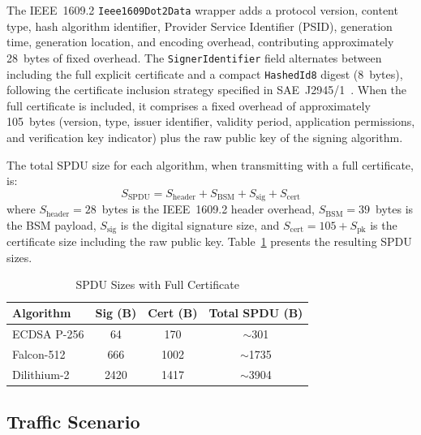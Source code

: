 \documentclass[letterpaper,journal]{IEEEtran}
\begin{document}
The IEEE~1609.2 \texttt{Ieee1609Dot2Data} wrapper adds a protocol version, content type, hash algorithm identifier, Provider Service Identifier (PSID), generation time, generation location, and encoding overhead, contributing approximately 28~bytes of fixed overhead. The \texttt{SignerIdentifier} field alternates between including the full explicit certificate and a compact \texttt{HashedId8} digest (8~bytes), following the certificate inclusion strategy specified in SAE~J2945/1~\cite{sae_j29451}. When the full certificate is included, it comprises a fixed overhead of approximately 105~bytes (version, type, issuer identifier, validity period, application permissions, and verification key indicator) plus the raw public key of the signing algorithm.

The total SPDU size for each algorithm, when transmitting with a full certificate, is:
\begin{equation}
    S_\text{SPDU} = S_\text{header} + S_\text{BSM} + S_\text{sig} + S_\text{cert}
    \label{eq:spdu_size}
\end{equation}
where $S_\text{header} = 28$~bytes is the IEEE~1609.2 header overhead, $S_\text{BSM} = 39$~bytes is the BSM payload, $S_\text{sig}$ is the digital signature size, and $S_\text{cert} = 105 + S_\text{pk}$ is the certificate size including the raw public key. Table~\ref{tab:spdu_sizes} presents the resulting SPDU sizes.

\begin{table}[!htbp]
    \caption{SPDU Sizes with Full Certificate}
    \label{tab:spdu_sizes}
    \centering
    \begin{tabular}{lccc}
    \toprule
    \textbf{Algorithm} & \textbf{Sig (B)} & \textbf{Cert (B)} & \textbf{Total SPDU (B)} \\
    \midrule
    ECDSA P-256    & 64   & 170  & $\sim$301 \\
    Falcon-512     & 666  & 1002 & $\sim$1735 \\
    Dilithium-2    & 2420 & 1417 & $\sim$3904 \\
    \bottomrule
    \end{tabular}
\end{table}

\subsection{Traffic Scenario}
\label{sec:traffic_scenario}
\end{document}
